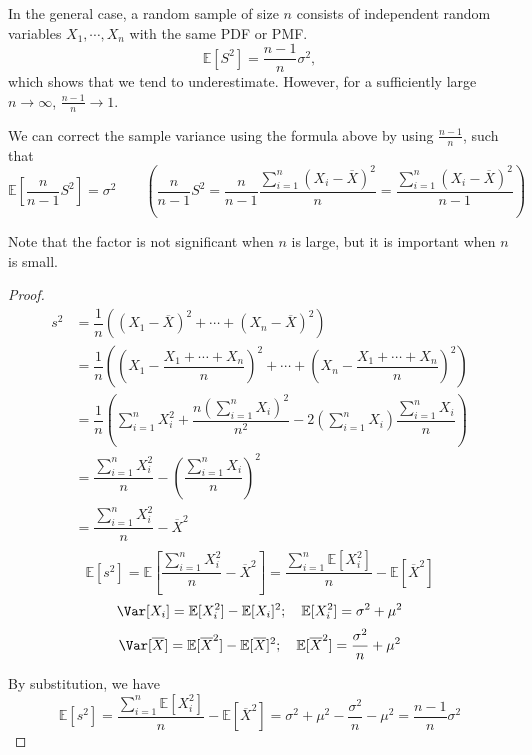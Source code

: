In the general case, a random sample of size \(n\) consists of independent random variables \(X_1, \cdots, X_n\) with the same PDF or PMF.
\[
  \mathbb{E}[S^2] = \dfrac{n - 1}{n} \sigma^2, 
\]
which shows that we tend to underestimate. However, for a sufficiently large \(n \to \infty\), \(\frac{n - 1}{n} \to 1\). 

We can correct the sample variance using the formula above by using \(\frac{n - 1}{n}\), such that 
\[
  \mathbb{E}[\dfrac{n}{n - 1} S^2] = \sigma^2 \quad\quad \left(\dfrac{n}{n - 1} S^2 = \dfrac{n}{n - 1} \dfrac{\sum_{i = 1}^n (X_i - \overline{X})^2}{n} = \dfrac{\sum_{i = 1}^n (X_i - \overline{X})^2}{n - 1}\right)
\]

Note that the factor is not significant when \(n\) is large, but it is important when \(n\) is small.

\begin{proof}
  \[
    \begin{aligned}
      s^2 &= \dfrac{1}{n} \left((X_1 - \overline{X})^2 + \cdots + (X_n - \overline{X})^2\right) \\
      &= \dfrac{1}{n} \left(\left(X_1 - \dfrac{X_1 + \cdots + X_n}{n}\right)^2 + \cdots + \left(X_n - \dfrac{X_1 + \cdots + X_n}{n}\right)^2\right) \\
      &= \dfrac{1}{n} \left(\sum_{i = 1}^n X_i^2 + \dfrac{n(\sum_{i = 1}^n X_i)^2}{n^2} - 2\left(\sum_{i = 1}^n X_i\right)\dfrac{\sum_{i = 1}^n X_i}{n}\right) \\
      &= \dfrac{\sum_{i = 1}^n X_i^2}{n} - \left(\dfrac{\sum_{i = 1}^n X_i}{n}\right)^2 \\
      &= \dfrac{\sum_{i = 1}^n X_i^2}{n} - \overline{X}^2 \\
    \end{aligned}
  \]
  \[
    \mathbb{E}[s^2] = \mathbb{E}\left[\dfrac{\sum_{i = 1}^n X_i^2}{n} - \overline{X}^2\right] = \dfrac{\sum_{i = 1}^n \mathbb{E}[X_i^2]}{n} - \mathbb{E}[\overline{X}^2]
  \]
  \[
    \Var[X_i] = \mathbb{E}[X_i^2] - \mathbb{E}[X_i]^2; \quad \mathbb{E}[X_i^2] = \sigma^2 + \mu^2
  \]
  \[
    \Var[\overline{X}] = \mathbb{E}[\overline{X}^2] - \mathbb{E}[\overline{X}]^2; \quad \mathbb{E}[\overline{X}^2] = \dfrac{\sigma^2}{n} + \mu^2
  \]

  By substitution, we have 
  \[
    \mathbb{E}[s^2] = \dfrac{\sum_{i = 1}^n \mathbb{E}[X_i^2]}{n} - \mathbb{E}[\overline{X}^2] = \sigma^2 + \mu^2 - \dfrac{\sigma^2}{n} - \mu^2 = \dfrac{n - 1}{n}\sigma^{2}
  \]
\end{proof}

